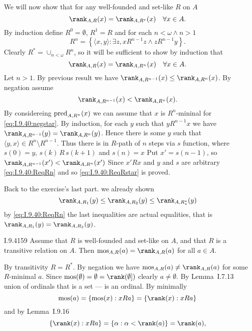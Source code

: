 We will now show that for any well-founded and set-like $R$ on $A$
\begin{equation} \label{eq:I.9.40:ReqRstar}
\rank_{A,R}(x) = \rank_{A,R^*}(x) \quad \forall x\in A.
\end{equation}
By induction define \(R^0=\emptyset\), \(R^1=R\)
and for each \(n<\omega \land n > 1\)
\begin{equation*}
R^n = \left\{\langle x, y \rangle: \exists z, xR^{n-1}z \land zR^{n-1}y\right\}.
\end{equation*}
Clearly \(R^* = \cup_{n<\omega}R^n\), so it will
be sufficient to show by induction that
\begin{equation}  \label{eq:I.9.40:ReqRn}
\rank_{A,R}(x) = \rank_{A,R^n}(x) \quad \forall x\in A.
\end{equation}
Let \(n > 1\).
By previous result we have \(\rank_{A,R^{n-1}}(x) \leq \rank_{A,R^n}(x)\).
By negation assume
\begin{equation} \label{eq:I.9.40:negstar}
\rank_{A,R^{n-1}}(x) < \rank_{A,R^n}(x).
\end{equation}
By considereing \(\mathop{\mathrm{pred}}_{A,R^n}(x)\)
we can assume that $x$ is \(R^n\)-mininal for \eqref{eq:I.9.40:negstar}.
By induction, for each $y$ such that \(yR^{n-1}x\) we have
\(\rank_{A,R^{n-1}}(y) = \rank_{A,R^n}(y)\). Hence there is some $y$
such that \(\langle y, x \rangle \in R^n \setminus R^{n-1}\).
Thus there is in $R$-path of $n$ steps via $s$ function,
where \(s(0)=y\), \(s(k)\,R\,s(k+1)\) and \(s(n)=x\)
Put \(x'=s(n-1)\), so \(\rank_{A,R^{n-1}}(x') < \rank_{A,R^n}(x')\)
Since \(x'Rx\) and $y$ and $s$ are arbitrary \eqref{eq:I.9.40:ReqRn}
and so \eqref{eq:I.9.40:ReqRstar} is proved.

Back to the exercise's last part.  we already shown
\begin{equation*}
\rank_{A,R_1}(y) \leq \rank_{A,R_2}(y) \leq \rank_{A,R_*^*}(y)
\end{equation*}
by \eqref{eq:I.9.40:ReqRn} the last inequalities are actual equalities,
that is \(\rank_{A,R_1}(y) = \rank_{A,R_2}(y)\).

\begin{lexcopy}{I.9.41}{59}
Assume that $R$ is well-founded and set-like on $A$, and that $R$
is a transitive relation on $A$.
Then \(\mos_{A,R}(a) = \rank_{A,R}(a)\) for all \(a \in A\).
\end{lexcopy}

By transitivity \(R=R^*\).
By negation we have \(\mos_{A,R}(a) \neq \rank_{A,R}(a)\)
for some $R$-minimal $a$.
Since \(\mos(\emptyset)=\emptyset=\rank(\emptyset])\)
clearly \(a\neq\emptyset\).
By Lemma~I.7.13 union of ordinals that is a set --- is an ordinal.
By minimally
\begin{equation*}
\mos(a)
= \{\mos(x): xRa\}
= \{\rank(x): xRa\} %
\end{equation*}
and by Lemma~I.9.16
\begin{equation*}
\{\rank(x): xRa\} = \{\alpha: \alpha < \rank(a)\} = \rank(a),
\end{equation*}

